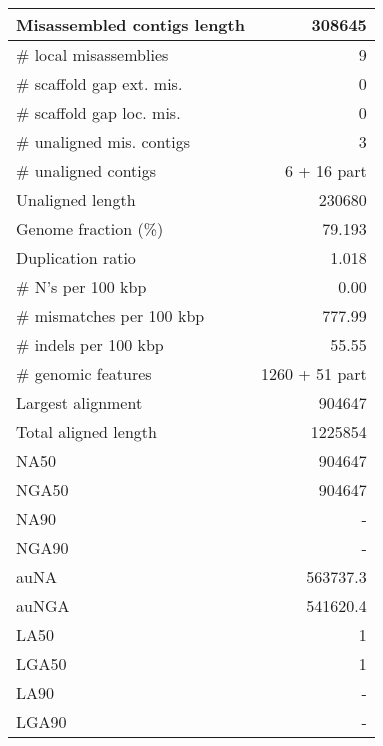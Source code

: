 \documentclass[12pt,a4paper]{article}
\begin{document}
\begin{table}[ht]
\begin{center}
\begin{tabular}{|l*{1}{|r}|}
Misassembled contigs length & 308645 \\ \hline
\# local misassemblies & 9 \\ \hline
\# scaffold gap ext. mis. & 0 \\ \hline
\# scaffold gap loc. mis. & 0 \\ \hline
\# unaligned mis. contigs & 3 \\ \hline
\# unaligned contigs & 6 + 16 part \\ \hline
Unaligned length & 230680 \\ \hline
Genome fraction (\%) & 79.193 \\ \hline
Duplication ratio & 1.018 \\ \hline
\# N's per 100 kbp & 0.00 \\ \hline
\# mismatches per 100 kbp & 777.99 \\ \hline
\# indels per 100 kbp & 55.55 \\ \hline
\# genomic features & 1260 + 51 part \\ \hline
Largest alignment & 904647 \\ \hline
Total aligned length & 1225854 \\ \hline
NA50 & 904647 \\ \hline
NGA50 & 904647 \\ \hline
NA90 & - \\ \hline
NGA90 & - \\ \hline
auNA & 563737.3 \\ \hline
auNGA & 541620.4 \\ \hline
LA50 & 1 \\ \hline
LGA50 & 1 \\ \hline
LA90 & - \\ \hline
LGA90 & - \\ \hline
\end{tabular}
\end{center}
\end{table}
\end{document}
